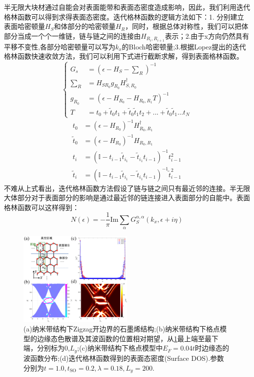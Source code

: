 	半无限大块材通过自能会对表面能带和表面态密度造成影响，因此，我们利用迭代格林函数可以得到求得表面态密度。迭代格林函数的逻辑方法如下：1. 分别建立表面哈密顿量$H_S$和体部分的哈密顿量$H_R$，同时，根据总体对称性，我们可以把体部分当成一个个一维链，链与链之间的连接由$H_{R_i,R_{i+1}}$表示；2.由于x方向仍然具有平移不变性,各部分哈密顿量可以写为$k_x$的Bloch哈密顿量;3.根据Lopez提出的迭代格林函数快速收敛方法\cite{sancho1985}，我们可以利用下式进行截断求解，得到表面格林函数。
	\begin{equation}
	    \left\{
	    \begin{aligned}
	    G_s&=(\epsilon-H_S-\sum _R)^{-1}  \\
	    \sum _R&=H_{S R_0} g_{R_0} H_{S,R_0}^\dagger\\
	    g_{R_0}&=(\epsilon-H_{R_0}-H_{R_0,R_1}T)^{-1}\\
        T&=t_0+\tilde{t}_0 t_1+\tilde{t}_0\tilde{t}_1t_2+...+\tilde{t}_0\tilde{t}_1\dots t_N
	    \end{aligned}
	    \right.
	\end{equation}
    \[
    \begin{aligned}
    t_0&=(\epsilon-H_{R_0})^{-1}H_{R_0,R_1}^\dagger\\
    \tilde{t}_0&=(\epsilon-H_{R_0})^{-1}H_{R_0,R_1}\\
    t_i&=(\mathbb{I}-t_{i-1}\tilde{t}_{i_1}-\tilde{t}_{i_1} t_{i-1})^{-1} t_{i-1}^2 \\
    \tilde{t}_i&=(\mathbb{I}-t_{i-1}\tilde{t}_{i_1}-\tilde{t}_{i_1} t_{i-1})^{-1} \tilde{t}_{i-1}^2
    \end{aligned}
    \]
    不难从上式看出，迭代格林函数方法假设了链与链之间只有最近邻的连接。半无限大体部分对于表面部分的影响是通过最近邻的链连接进入表面部分的自能中。表面格林函数可以这样得到：
    \begin{equation}
      N(\epsilon)=-\frac{1}{\pi}\text{Im}\sum_{\alpha} G_S^{\alpha,\alpha}(k_x,\epsilon+i\eta)
    \end{equation}


    \begin{figure}
      \centering
     \includegraphics[width=0.5\textwidth]{pic/fig2.pdf}
      \caption{(a)纳米带结构下Zigzag开边界的石墨烯结构;(b)纳米带结构下格点模型的边缘态色散谱及其波函数的位置相对期望，从\ref{fig2:OPB}最上端至最下端，分别标为0,$L_y$;(c)纳米带结构下格点模型中$E_F=0.04t$时边缘态的波函数分布;(d)迭代格林函数得到的表面态密度(Surface DOS).参数分别为$t=1.0,t_{\text{SO}}=0.2,\lambda=0.18,L_y=200.$}
	    \label{fig2:OPB}
    \end{figure}

